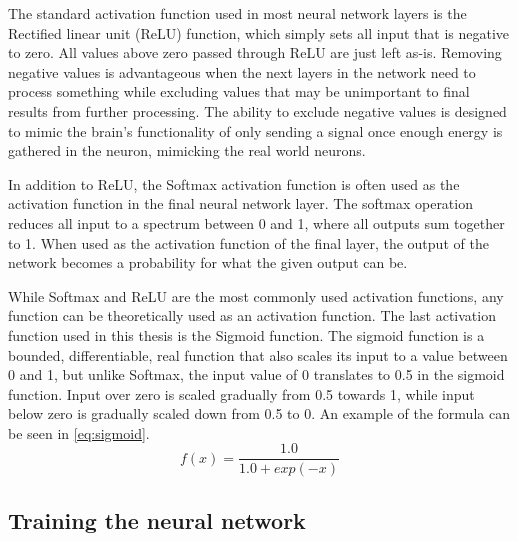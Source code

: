 The standard activation function used in most neural network layers is the Rectified linear unit (ReLU) function, which simply sets all input that is negative to zero.
All values above zero passed through ReLU are just left as-is.
Removing negative values is advantageous when the next layers in the network need to process something while excluding values that may be unimportant to final results from further processing.
The ability to exclude negative values is designed to mimic the brain's functionality of only sending a signal once enough energy is gathered in the neuron, mimicking the real world neurons.

In addition to ReLU, the Softmax activation function is often used as the activation function in the final neural network layer.
The softmax operation reduces all input to a spectrum between 0 and 1, where all outputs sum together to 1.
When used as the activation function of the final layer, the output of the network becomes a probability for what the given output can be.

While Softmax and ReLU are the most commonly used activation functions, any function can be theoretically used as an activation function.
The last activation function used in this thesis is the Sigmoid function.
The sigmoid function is a bounded, differentiable, real function\cite{wiki:sigmoid} that also scales its input to a value between 0 and 1, but unlike Softmax, the input value of 0 translates to 0.5 in the sigmoid function.
Input over zero is scaled gradually from 0.5 towards 1, while input below zero is gradually scaled down from 0.5 to 0.
An example of the formula can be seen in \cref{eq:sigmoid}.
\begin{equation}
    f(x) =  \frac{1.0}{1.0 + exp(-x)}
    \label{eq:sigmoid}
\end{equation}





\subsection{Training the neural network}

